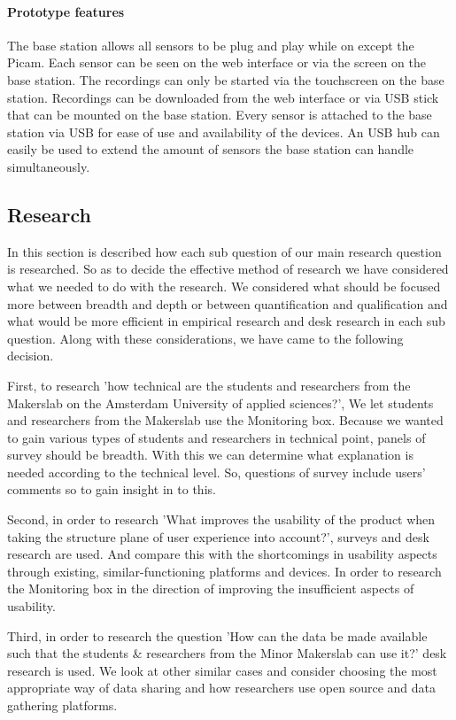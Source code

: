 \documentclass[conference]{IEEEtran}
\begin{document}
		\paragraph{Prototype features}
			The base station allows all sensors to be plug and play while on except the Picam. Each sensor can be seen on the web interface or via the screen on the base station. The recordings can only be started via the touchscreen on the base station. Recordings can be downloaded from the web interface or via USB stick that can be mounted on the base station. Every sensor is attached to the base station via USB for ease of use and availability of the devices. An USB hub can easily be used to extend the amount of sensors the base station can handle simultaneously. 
	\subsection{Research}
		In this section is described how each sub question of our main research question is researched. So as to decide the effective method of research we have considered what we needed to do with the research. We considered what should be focused more between breadth and depth or between quantification and qualification and what would be more efficient in empirical research and desk research in each sub question. Along with these considerations, we have came to the following decision. 

		First, to research 'how technical are the students and researchers from the Makerslab on the Amsterdam University of applied sciences?', We let students and researchers from the Makerslab use the Monitoring box. Because we wanted to gain various types of students and researchers in technical point, panels of survey should be breadth. With this we can determine what explanation is needed according to the technical level. So, questions of survey include users' comments so to gain insight in to this. 

		Second, in order to research 'What improves the usability of the product when taking the structure plane of user experience into account?', surveys and desk research are used. And compare this with the shortcomings in usability aspects through existing, similar-functioning platforms and devices. In order to research the Monitoring box in the direction of improving the insufficient aspects of usability.

		Third, in order to research the question 'How can the data be made available such that the students \& researchers from the Minor Makerslab can use it?' desk research is used. We look at other similar cases and consider choosing the most appropriate way of data sharing and how researchers use open source and data gathering platforms.
\end{document}
